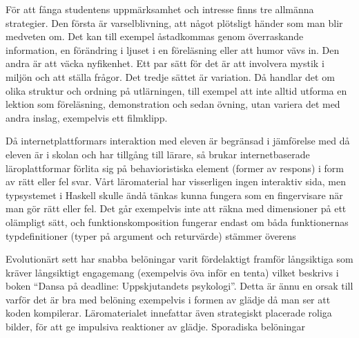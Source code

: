 \begin{draft}
För att fånga studentens uppmärksamhet och intresse finns tre allmänna
strategier. Den första är varselblivning, att något plötsligt händer som man
blir medveten om. Det kan till exempel åstadkommas genom överraskande
information, en förändring i ljuset i en föreläsning eller att humor vävs in.
Den andra är att väcka nyfikenhet. Ett par sätt för det är att involvera mystik
i miljön och att ställa frågor. Det tredje sättet är variation. Då handlar det
om olika struktur och ordning på utlärningen, till exempel att inte alltid
utforma en lektion som föreläsning, demonstration och sedan övning, utan variera
det med andra inslag, exempelvis ett filmklipp.


Då internetplattformars interaktion med eleven är begränsad i jämförelse med då
eleven är i skolan och har tillgång till lärare, så brukar internetbaserade
läroplattformar förlita sig på behavioristiska element (former av respons) i form av rätt eller fel
svar\cite{LSB_und}. Vårt läromaterial har visserligen ingen interaktiv sida,
men typsystemet i Haskell skulle ändå tänkas kunna fungera som en fingervisare
när man gör rätt eller fel. Det går exempelvis inte att räkna med dimensioner
på ett olämpligt sätt, och funktionskomposition fungerar endast om båda funktionernas
typdefinitioner (typer på argument och returvärde) stämmer överens 

Evolutionärt sett har snabba belöningar varit fördelaktigt framför långsiktiga
som kräver långsiktigt engagemang (exempelvis öva inför en tenta) vilket beskrivs i
boken ``Dansa på deadline: Uppskjutandets psykologi''\cite{DPD}. Detta är ännu en
orsak till varför det är bra med belöning exempelvis i formen av glädje då man
ser att koden kompilerar. Läromaterialet innefattar även strategiskt placerade
roliga bilder, för att ge impulsiva reaktioner av glädje. Sporadiska belöningar

\end{draft}

